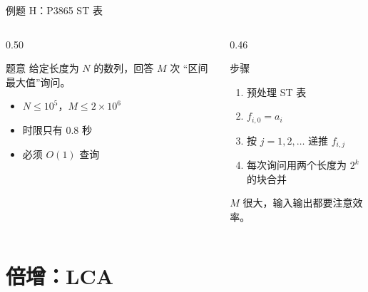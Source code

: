 \documentclass[aspectratio=169]{beamer}
\begin{document}
\begin{frame}{例题 H：P3865 ST 表}
    \begin{columns}[T]
        \begin{column}{0.50\textwidth}
            \small
            \begin{block}{题意}
                \footnotesize
                给定长度为 $N$ 的数列，回答 $M$ 次
                “区间最大值”询问。
            \end{block}
            \begin{itemize}
                \item $N\le 10^5$，$M\le 2\times10^6$
                \item 时限只有 $0.8$ 秒
                \item 必须 $O(1)$ 查询
            \end{itemize}
        \end{column}
        \begin{column}{0.46\textwidth}
            \begin{block}{步骤}
                \footnotesize
                \begin{enumerate}
                    \item 预处理 ST 表
                    \item $f_{i,0}=a_i$
                    \item 按 $j=1,2,\dots$ 递推 $f_{i,j}$
                    \item 每次询问用两个长度为 $2^k$ 的块合并
                \end{enumerate}
            \end{block}
            \vspace{0.4em}
            \footnotesize
            $M$ 很大，输入输出都要注意效率。
        \end{column}
    \end{columns}
\end{frame}

\section{倍增：LCA}
\end{document}

